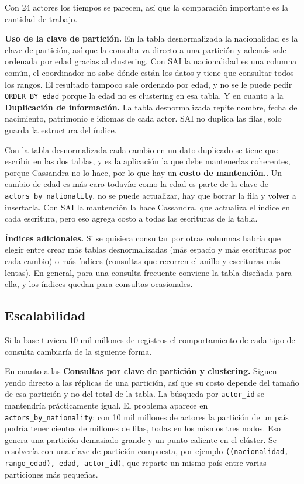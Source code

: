 \documentclass[11pt,a4paper]{article}
\begin{document}
Con 24 actores los tiempos se parecen, así que la comparación importante es la cantidad de
trabajo.

\textbf{Uso de la clave de partición.} En la tabla desnormalizada la nacionalidad es la clave
de partición, así que la consulta va directo a una partición y además sale ordenada por edad
gracias al clustering. Con SAI la nacionalidad es una columna común, el coordinador no sabe
dónde están los datos y tiene que consultar todos los rangos. El resultado tampoco sale
ordenado por edad, y no se le puede pedir \texttt{ORDER BY edad} porque la edad no es
clustering en esa tabla. Y en cuanto a la \textbf{Duplicación de información.} 
La tabla desnormalizada repite nombre, fecha de
nacimiento, patrimonio e idiomas de cada actor. SAI no duplica las filas, solo guarda la
estructura del índice.

 Con la tabla desnormalizada cada cambio en un dato duplicado se
tiene que escribir en las dos tablas, y es la aplicación la que debe mantenerlas coherentes,
porque Cassandra no lo hace, por lo que hay un \textbf{costo de mantención.}. 
Un cambio de edad es más caro todavía: como la edad es parte de
la clave de \texttt{actors\_by\_nationality}, no se puede actualizar, hay que borrar la fila y
volver a insertarla. Con SAI la mantención la hace Cassandra, que actualiza el índice en cada
escritura, pero eso agrega costo a todas las escrituras de la tabla.

\textbf{Índices adicionales.} Si se quisiera consultar por otras columnas habría que elegir
entre crear más tablas desnormalizadas (más espacio y más escrituras por cada cambio) o más
índices (consultas que recorren el anillo y escrituras más lentas). En general, para una
consulta frecuente conviene la tabla diseñada para ella, y los índices quedan para consultas
ocasionales.

\subsection{Escalabilidad}

Si la base tuviera 10 mil millones de registros el comportamiento de cada tipo de consulta
cambiaría de la siguiente forma.

En cuanto a las \textbf{Consultas por clave de partición y clustering.} Siguen yendo directo a las réplicas de
una partición, así que su costo depende del tamaño de esa partición y no del total de la
tabla. La búsqueda por \texttt{actor\_id} se mantendría prácticamente igual. El problema
aparece en \texttt{actors\_by\_nationality}: con 10 mil millones de actores la partición de un
país podría tener cientos de millones de filas, todas en los mismos tres nodos. Eso genera una
partición demasiado grande y un punto caliente en el clúster. Se resolvería con una clave de
partición compuesta, por ejemplo \texttt{((nacionalidad, rango\_edad), edad, actor\_id)}, que
reparte un mismo país entre varias particiones más pequeñas.
\end{document}
